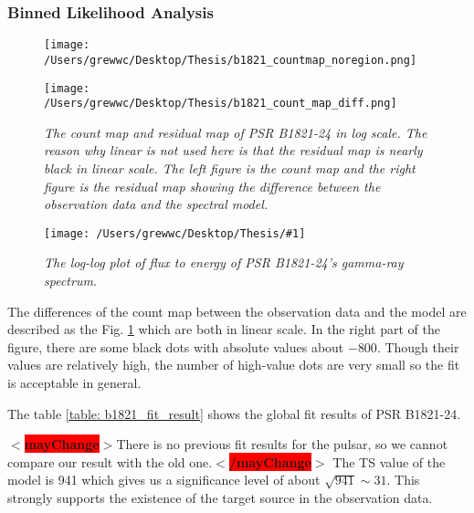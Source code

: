 \documentclass[12pt]{report}
\newcommand{\mycaption}[1]{\caption{\textit{\footnotesize #1}}}
\newcommand{\singleFig}[3]{
 \begin{figure}[!ht]
  \centering
  \texttt{[image: /Users/grewwc/Desktop/Thesis/\#1]}
  \mycaption{#3}
 \label{fig: #1}
 \end{figure}
}
\newcommand{\mayChange}[1]{
  $<$\colorbox{red}{\textbf{mayChange}}$>$#1$<$\colorbox{red}{\textbf{/mayChange}}$>$
}
\begin{document}
              \subsubsection{Binned Likelihood Analysis}
              \begin{figure}[!ht]
                \begin{center}
                \begin{minipage}{0.45\textwidth}
                  \begin{center} 
                    \texttt{[image: /Users/grewwc/Desktop/Thesis/b1821\_countmap\_noregion.png]}
                  \end{center}
                \end{minipage}
                \begin{minipage}{0.45\textwidth}
                  \begin{center}
                    \texttt{[image: /Users/grewwc/Desktop/Thesis/b1821\_count\_map\_diff.png]}
                  \end{center}
                \end{minipage}
              \end{center}
              \mycaption{The count map and residual map of PSR B1821-24 in log scale. 
              The reason why linear is not used here is that the residual map is nearly black in linear scale.
              The \textsf{left} figure is the count map and the \textsf{right} 
              figure is the residual map showing the difference between the observation data and the spectral model.}
              \label{fig: b1821_count_map_diff.png}
            \end{figure}

            \singleFig{b1821_cur.png}{0.40}{The log-log plot of flux to energy of 
              PSR B1821-24's gamma-ray spectrum.}
              \vspace{1cm}

            The differences of the count map between the observation data and the model are described as the Fig.
            \ref{fig: b1821_count_map_diff.png} which are both in linear scale. In the right part of the figure, 
            there are some black dots 
            with absolute values about $-800$. Though their values are relatively high, the number of 
            high-value dots are very small so the fit is acceptable in general. 

            The table \ref{table: b1821_fit_result} shows the global fit results of PSR B1821-24. 
            \mayChange{There is no previous fit results for the pulsar, so we cannot compare our result
            with the old one.} The TS value of the model is 941 which gives us a significance level 
            of about $\sqrt{941} \sim 31$. This strongly supports the existence of the target source in 
            the observation data.
\end{document}
